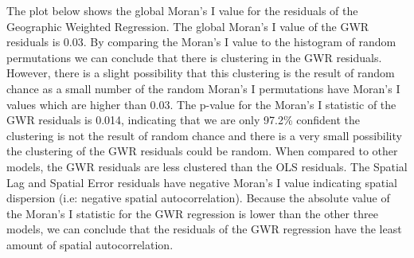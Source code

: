 \documentclass[
]{article}
\begin{document}
The plot below shows the global Moran's I value for the residuals of the
Geographic Weighted Regression. The global Moran's I value of the GWR
residuals is 0.03. By comparing the Moran's I value to the histogram of
random permutations we can conclude that there is clustering in the GWR
residuals. However, there is a slight possibility that this clustering
is the result of random chance as a small number of the random Moran's I
permutations have Moran's I values which are higher than 0.03. The
p-value for the Moran's I statistic of the GWR residuals is 0.014,
indicating that we are only 97.2\% confident the clustering is not the
result of random chance and there is a very small possibility the
clustering of the GWR residuals could be random. When compared to other
models, the GWR residuals are less clustered than the OLS residuals. The
Spatial Lag and Spatial Error residuals have negative Moran's I value
indicating spatial dispersion (i.e: negative spatial autocorrelation).
Because the absolute value of the Moran's I statistic for the GWR
regression is lower than the other three models, we can conclude that
the residuals of the GWR regression have the least amount of spatial
autocorrelation.
\end{document}
